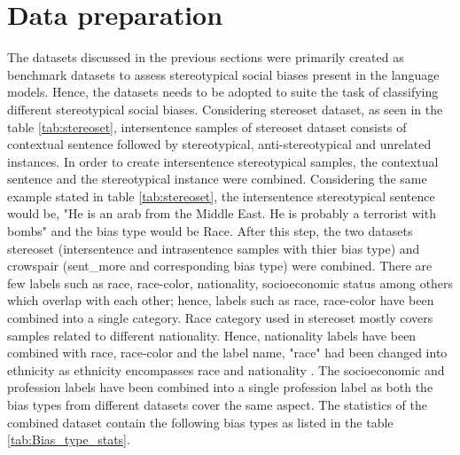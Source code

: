 \section{Data preparation}\label{data preparation}
The datasets discussed in the previous sections were primarily created as benchmark datasets to assess stereotypical social biases present in the language models. Hence, the datasets needs to be adopted to suite the task of classifying different stereotypical social biases. Considering stereoset dataset, as seen in the table \ref{tab:stereoset}, intersentence samples of  stereoset dataset consists of contextual sentence followed by  stereotypical, anti-stereotypical and unrelated instances. In order to create intersentence stereotypical samples, the contextual sentence and the stereotypical instance were combined. Considering the same example stated in table \ref{tab:stereoset}, the intersentence stereotypical sentence would be, "He is an arab from the Middle East. He is probably a terrorist with bombs" and the bias type would be Race. After this step, the two datasets stereoset (intersentence and intrasentence samples with thier bias type) and crowspair (sent\_more and corresponding bias type) were combined. There are few labels such as race, race-color, nationality, socioeconomic status among others which overlap with each other; hence, labels such as race, race-color have been combined into a single category. Race category used in stereoset mostly covers samples related to different nationality. Hence, nationality labels have been combined with race, race-color and the label name, "race" had been changed into ethnicity as ethnicity encompasses race and nationality \cite{winant2015race}. The socioeconomic and profession labels have been combined into a single profession label as both the bias types from different datasets cover the same aspect. The statistics of the combined dataset contain the following bias types as listed in the table \ref{tab:Bias_type_stats}. 
